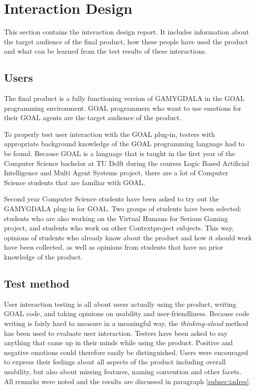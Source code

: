 \section{Interaction Design}
This section contains the interaction design report. It includes information about the target audience of the final product, how these people have used the product and what can be learned from the test results of these interactions.

\subsection{Users}
The final product is a fully functioning version of GAMYGDALA in the GOAL programming environment. GOAL programmers who want to use emotions for their GOAL agents are the target audience of the product.

To properly test user interaction with the GOAL plug-in, testers with appropriate background knowledge of the GOAL programming language had to be found. Because GOAL is a language that is taught in the first year of the Computer Science bachelor at TU Delft during the courses Logic Based Artificial Intelligence and Multi Agent Systems project, there are a lot of Computer Science students that are familiar with GOAL.

Second year Computer Science students have been asked to try out the GAMYGDALA plug-in for GOAL. Two groups of students have been selected: students who are also working on the Virtual Humans for Serious Gaming project, and students who work on other Contextproject subjects. This way, opinions of students who already know about the product and how it should work have been collected, as well as opinions from students that have no prior knowledge of the product.

\subsection{Test method}
User interaction testing is all about users actually using the product, writing GOAL code, and taking opinions on usability and user-friendliness. Because code writing is fairly hard to measure in a meaningful way, the \textit{thinking-aloud} method \citep{thinking-aloud} has been used to evaluate user interaction. Testers have been asked to say anything that came up in their minds while using the product. Positive and negative emotions could therefore easily be distinguished. Users were encouraged to express their feelings about all aspects of the product including overall usability, but also about missing features, naming convention and other facets. All remarks were noted and the results are discussed in paragraph \ref{subsec:iadres}.


